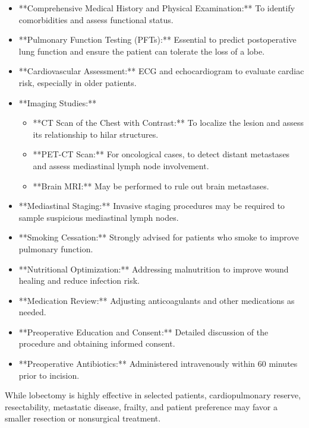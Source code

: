 \begin{itemize}
  \item **Comprehensive Medical History and Physical Examination:** To identify comorbidities and assess functional status.
  
  \item **Pulmonary Function Testing (PFTs):** Essential to predict postoperative lung function and ensure the patient can tolerate the loss of a lobe.
  
  \item **Cardiovascular Assessment:** ECG and echocardiogram to evaluate cardiac risk, especially in older patients.
  
  \item **Imaging Studies:**
    \begin{itemize}
      \item **CT Scan of the Chest with Contrast:** To localize the lesion and assess its relationship to hilar structures.
      \item **PET-CT Scan:** For oncological cases, to detect distant metastases and assess mediastinal lymph node involvement.
      \item **Brain MRI:** May be performed to rule out brain metastases.
    \end{itemize}
  
  \item **Mediastinal Staging:** Invasive staging procedures may be required to sample suspicious mediastinal lymph nodes.
  
  \item **Smoking Cessation:** Strongly advised for patients who smoke to improve pulmonary function.
  
  \item **Nutritional Optimization:** Addressing malnutrition to improve wound healing and reduce infection risk.
  
  \item **Medication Review:** Adjusting anticoagulants and other medications as needed.
  
  \item **Preoperative Education and Consent:** Detailed discussion of the procedure and obtaining informed consent.
  
  \item **Preoperative Antibiotics:** Administered intravenously within 60 minutes prior to incision.
\end{itemize}

While lobectomy is highly effective in selected patients, cardiopulmonary reserve, resectability, metastatic disease, frailty, and patient preference may favor a smaller resection or nonsurgical treatment.

